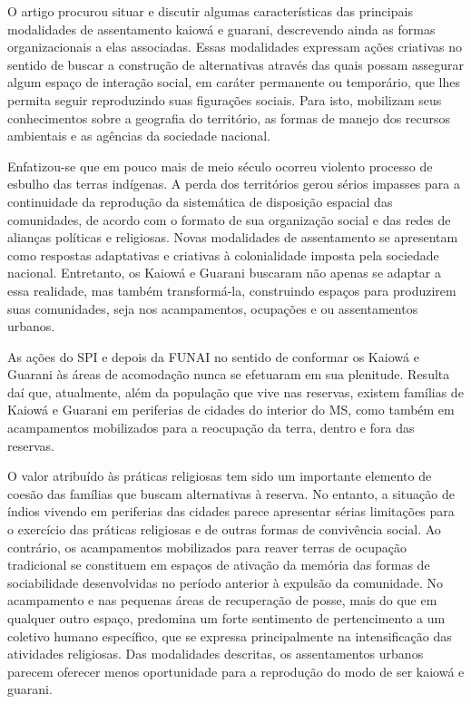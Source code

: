 O artigo procurou situar e discutir algumas características das
principais modalidades de assentamento kaiowá e guarani, descrevendo
ainda as formas organizacionais a elas associadas. Essas modalidades
expressam ações criativas no sentido de buscar a construção de
alternativas através das quais possam assegurar algum espaço de
interação social, em caráter permanente ou temporário, que lhes permita
seguir reproduzindo suas figurações sociais. Para isto, mobilizam seus
conhecimentos sobre a geografia do território, as formas de manejo dos
recursos ambientais e as agências da sociedade nacional. 

Enfatizou-se que em pouco mais de meio século ocorreu violento processo
de esbulho das terras indígenas. A perda dos territórios gerou sérios
impasses para a continuidade da reprodução da sistemática de disposição
espacial das comunidades, de acordo com o formato de sua organização
social e das redes de alianças políticas e religiosas. Novas
modalidades de assentamento se apresentam como respostas adaptativas e
criativas à colonialidade imposta pela sociedade nacional. Entretanto,
os Kaiowá e Guarani buscaram não apenas se adaptar a essa realidade,
mas também transformá-la, construindo espaços para produzirem suas
comunidades, seja nos acampamentos, ocupações e ou assentamentos
urbanos.

As ações do SPI e depois da FUNAI no sentido de conformar os Kaiowá e
Guarani às áreas de acomodação nunca se efetuaram em sua plenitude.
Resulta daí que, atualmente, além da população que vive nas reservas,
existem famílias de Kaiowá e Guarani em periferias de cidades do
interior do MS, como também em acampamentos mobilizados para a
reocupação da terra, dentro e fora das reservas.

O valor atribuído às práticas religiosas tem sido um importante elemento
de coesão das famílias que buscam alternativas à reserva. No entanto, a
situação de índios vivendo em periferias das cidades parece apresentar
sérias limitações para o exercício das práticas religiosas e de outras
formas de convivência social. Ao contrário, os acampamentos mobilizados
para reaver terras de ocupação tradicional se constituem em espaços de
ativação da memória das formas de sociabilidade desenvolvidas no
período anterior à expulsão da comunidade. No acampamento e nas
pequenas áreas de recuperação de posse, mais do que em qualquer outro
espaço, predomina um forte sentimento de pertencimento a um coletivo
humano específico, que se expressa principalmente na intensificação das
atividades religiosas. Das modalidades descritas, os assentamentos
urbanos parecem oferecer menos oportunidade para a reprodução do modo
de ser kaiowá e guarani. 

